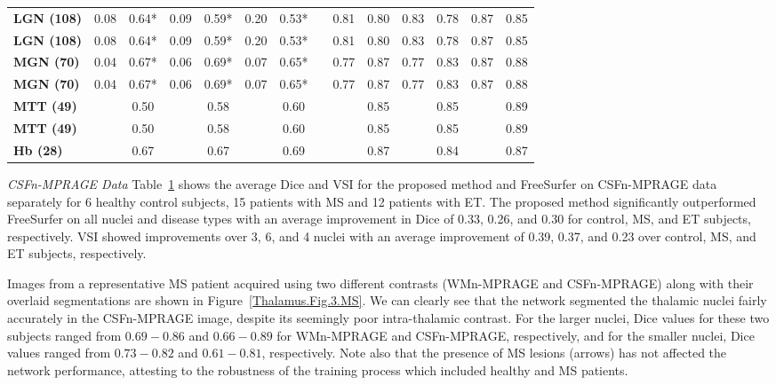 \begin{table}[]
{\begin{tabular}{lccccccccccccc}
\rowcolor[HTML]{FFFFFF}
\cellcolor[HTML]{D9D9D9}\textbf{LGN (108)} & 0.08 & 0.64* & 0.09 & 0.59* & 0.20 & 0.53* & & 0.81 & 0.80 & 0.83 & 0.78 & 0.87 & 0.85 \\
\cellcolor[HTML]{D9D9D9}\textbf{LGN (108)} & 0.08 & 0.64* & 0.09 & 0.59* & 0.20 & 0.53* & & 0.81 & 0.80 & 0.83 & 0.78 & 0.87 & 0.85 \\
\rowcolor[HTML]{FFFFFF}
\cellcolor[HTML]{D9D9D9}\textbf{MGN (70)} & 0.04 & 0.67* & 0.06 & 0.69* & 0.07 & 0.65* & & 0.77 & 0.87 & 0.77 & 0.83 & 0.87 & 0.88 \\
\cellcolor[HTML]{D9D9D9}\textbf{MGN (70)} & 0.04 & 0.67* & 0.06 & 0.69* & 0.07 & 0.65* & & 0.77 & 0.87 & 0.77 & 0.83 & 0.87 & 0.88 \\
\rowcolor[HTML]{FFFFFF}
\cellcolor[HTML]{D9D9D9}\textbf{MTT (49)} & & 0.50 & & 0.58 & & 0.60 & & & 0.85 & & 0.85 & & 0.89 \\
\cellcolor[HTML]{D9D9D9}\textbf{MTT (49)} & & 0.50 & & 0.58 & & 0.60 & & & 0.85 & & 0.85 & & 0.89 \\
\rowcolor[HTML]{FFFFFF}
\cellcolor[HTML]{D9D9D9}\textbf{Hb (28)} & & 0.67 & & 0.67 & & 0.69 & & & 0.87 & & 0.84 & & 0.87
\end{tabular}
}\label{tab:thalamus.table.4.comparison.freesurfer}
\end{table}

\emph{CSFn-MPRAGE Data}
Table~\ref{tab:thalamus.table.4.comparison.freesurfer}  shows the average Dice and VSI for the proposed method and FreeSurfer on CSFn-MPRAGE data separately for 6 healthy control subjects, 15 patients with MS and 12 patients with ET\@. The proposed method significantly outperformed FreeSurfer on all nuclei and disease types with an average improvement in Dice of 0.33, 0.26, and 0.30 for control, MS, and ET subjects, respectively. VSI showed improvements over 3, 6, and 4 nuclei with an average improvement of 0.39, 0.37, and 0.23 over control, MS, and ET subjects, respectively.


Images from a representative MS patient acquired using two different contrasts (WMn-MPRAGE and CSFn-MPRAGE) along with their overlaid segmentations are shown in Figure~\ref{Thalamus.Fig.3.MS}. We can clearly see that the network segmented the thalamic nuclei fairly accurately in the CSFn-MPRAGE image, despite its seemingly poor intra-thalamic contrast. For the larger nuclei, Dice values for these two subjects ranged from $0.69-0.86$ and $0.66-0.89$ for WMn-MPRAGE and CSFn-MPRAGE, respectively, and for the smaller nuclei, Dice values ranged from $0.73-0.82$ and $0.61-0.81$, respectively. Note also that the presence of MS lesions (arrows) has not affected the network performance, attesting to the robustness of the training process which included healthy and MS patients.

